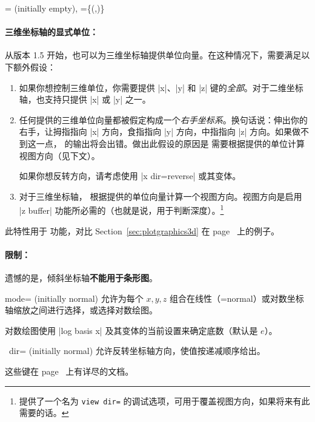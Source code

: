 \begin{pgfplotsxykeylist}{%
    \x= (initially empty),
    \x={\{(,)\}}%
}
    \paragraph{三维坐标轴的显式单位：}

    从版本 1.5 开始，也可以为三维坐标轴提供单位向量。在这种情况下，需要满足以下额外假设：
    \begin{enumerate}
        \item 如果你想控制三维单位，你需要提供 |x|、|y| 和 |z| 键的\emph{全部}。对于二维坐标轴，也支持只提供 |x| 或 |y| 之一。
        \item 任何提供的三维单位向量都被假定构成一个\emph{右手坐标系}。换句话说：伸出你的右手，让拇指指向 |x| 方向，食指指向 |y| 方向，中指指向 |z| 方向。如果做不到这一点，\PGFPlots{} 的输出将会出错。做出此假设的原因是 \PGFPlots{} 需要根据提供的单位计算视图方向（见下文）。

            如果你想反转方向，请考虑使用 |x dir=reverse| 或其变体。
        \item 对于三维坐标轴，\PGFPlots{} 根据提供的单位向量计算一个视图方向。视图方向是启用 |z buffer| 功能所必需的（也就是说，用于判断深度）。\footnote{\PGFPlots{} 提供了一个名为 \texttt{view dir=} 的调试选项，可用于覆盖视图方向，如果将来有此需要的话。}
    \end{enumerate}
    此特性用于  功能，对比 Section~\ref{sec:plotgraphics3d} 在 page~\pageref{sec:plotgraphics3d} 上的例子。


    \paragraph{限制：}

    遗憾的是，倾斜坐标轴\textbf{不能用于条形图}。
\end{pgfplotsxykeylist}

\begin{pgfplotsxykey}{\x mode= (initially normal)}
    允许为每个 $x,y,z$ 组合在线性（=normal）或对数坐标轴缩放之间进行选择，或选择对数绘图。

    对数绘图使用 |log basis x| 及其变体的当前设置来确定底数（默认是 $e$）。
\end{pgfplotsxykey}

{\def\pgfmanualpdflabel#1#2{}
\begin{pgfplotsxykey}{\x\ dir= (initially normal)}
    允许反转坐标轴方向，使值按递减顺序给出。

    这些键在 page~\pageref{key:pgfplots:xydir} 上有详尽的文档。
\end{pgfplotsxykey}
}

